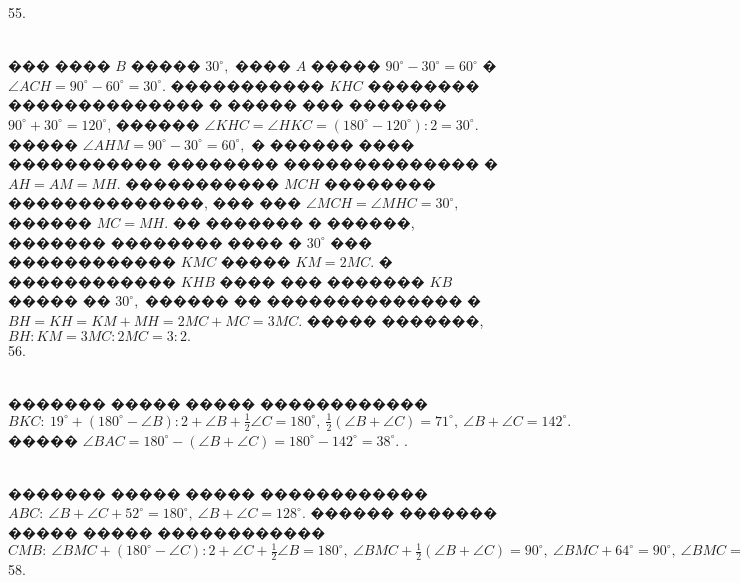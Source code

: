 \documentclass[12pt]{article}
\begin{document}
55. \begin{figure}[ht!]
\end{figure}\\
��� ���� $B$ ����� $30^\circ,$ ���� $A$ ����� $90^\circ-30^\circ=60^\circ$ � $\angle ACH=90^\circ-60^\circ=30^\circ.$  ����������� $KHC$ �������� �������������� � ����� ��� ������� $90^\circ+30^\circ=120^\circ$, ������ $\angle KHC=\angle HKC=(180^\circ-120^\circ):2=30^\circ.$ ����� $\angle AHM=90^\circ-30^\circ=60^\circ,$ � ������ ���� ����������� �������� �������������� � $AH=AM=MH.$ ����������� $MCH$ �������� ��������������, ��� ��� $\angle MCH=\angle MHC=30^\circ,$ ������ $MC=MH.$  �� ������� � ������, ������� �������� ���� � $30^\circ$ ��� ������������ $KMC$ ����� $KM=2MC.$ � ������������ $KHB$ ���� ��� ������� $KB$ ����� �� $30^\circ,$ ������ �� �������������� �  $BH=KH=KM+MH=2MC+MC=3MC.$ ����� �������, $BH:KM=3MC:2MC=3:2.$\\
56. \begin{figure}[ht!]
\end{figure}\\
������� ����� ����� ������������ $BKC:\ 19^\circ+(180^\circ-\angle B):2+\angle B+\frac{1}{2}\angle C=180^\circ,\ \frac{1}{2}(\angle B+\angle C)=71^\circ,\ \angle B+\angle C=142^\circ.$ ����� $\angle BAC=180^\circ-(\angle B+\angle C)=180^\circ-142^\circ=38^\circ.$\newpage
{}. \begin{figure}[ht!]
\end{figure}\\
������� ����� ����� ������������ $ABC:\ \angle B+\angle C+52^\circ=180^\circ,\ \angle B+\angle C=128^\circ.$ ������ ������� ����� ����� ������������ $CMB:\ \angle BMC+(180^\circ-\angle C):2+\angle C+\frac{1}{2}\angle B=180^\circ,\ \angle BMC+\frac{1}{2}(\angle B+\angle C)=90^\circ,\ \angle BMC+64^\circ=90^\circ,\ \angle BMC=26^\circ.$\\
58. \begin{figure}[ht!]
\end{figure}\\
\end{document}
